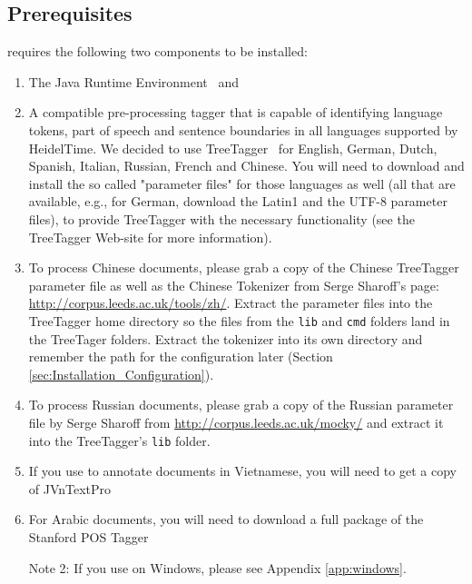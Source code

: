 \subsection{Prerequisites}\label{sec:Installation_Prerequisites}
\product{} requires the following two components to be installed:
\begin{enumerate}
\item The Java Runtime Environment~\cite{Java} and
\item A compatible pre-processing tagger that is capable of identifying language tokens, part of speech and sentence boundaries in all languages supported by HeidelTime. We decided to use TreeTagger~\cite{TreeTagger} for English, German, Dutch, Spanish, Italian, Russian, French and Chinese. You will need to download and install the so called "parameter files" for those languages as well (all that are available, e.g., for German, download the Latin1 and the UTF-8 parameter files), to provide TreeTagger with the necessary functionality (see the TreeTagger Web-site for more information).
\item To process Chinese documents, please grab a copy of the Chinese TreeTagger parameter file as well as the Chinese Tokenizer from Serge Sharoff's page: \url{http://corpus.leeds.ac.uk/tools/zh/}. Extract the parameter files into the TreeTagger home directory so the files from the \texttt{lib} and \texttt{cmd} folders land in the TreeTager folders. Extract the tokenizer into its own directory and remember the path for the configuration later (Section \ref{sec:Installation_Configuration}).
\item To process Russian documents, please grab a copy of the Russian parameter file by Serge Sharoff from \url{http://corpus.leeds.ac.uk/mocky/} and extract it into the TreeTagger's \texttt{lib} folder.
\item If you use \product{} to annotate documents in Vietnamese, you will need to get a copy of JVnTextPro~\cite{JVnTextPro}
\item For Arabic documents, you will need to download a full package of the Stanford POS Tagger~\cite{StanfordPOSTagger}

Note 2: If you use \product{} on Windows, please see Appendix \ref{app:windows}.
\end{enumerate}

